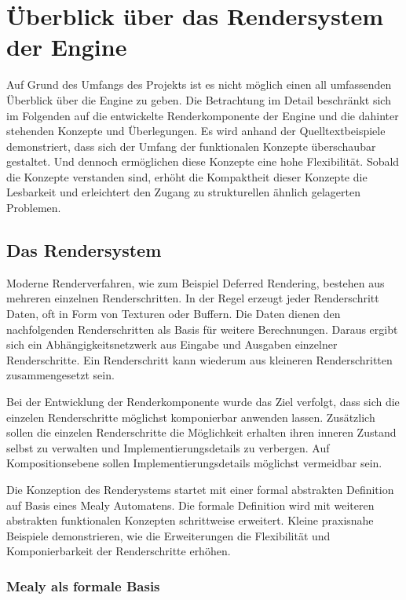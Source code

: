 \chapter{Überblick über das Rendersystem der Engine}
\label{chap:ueberblick-pipeline}

Auf Grund des Umfangs des Projekts ist es nicht möglich einen all umfassenden Überblick über die Engine zu geben. Die Betrachtung im Detail beschränkt sich im Folgenden auf die entwickelte Renderkomponente der Engine und die dahinter stehenden Konzepte und Überlegungen. Es wird anhand der Quelltextbeispiele demonstriert, dass sich der Umfang der funktionalen Konzepte überschaubar gestaltet. Und dennoch ermöglichen diese Konzepte eine hohe Flexibilität. Sobald die Konzepte verstanden sind, erhöht die Kompaktheit dieser Konzepte die Lesbarkeit und erleichtert den Zugang zu strukturellen ähnlich gelagerten Problemen.

\section{Das Rendersystem}

Moderne Renderverfahren, wie zum Beispiel Deferred Rendering, bestehen aus mehreren einzelnen Renderschritten. In der Regel erzeugt jeder Renderschritt Daten, oft in Form von Texturen oder Buffern. Die Daten dienen den nachfolgenden Renderschritten als Basis für weitere Berechnungen. Daraus ergibt sich ein Abhängigkeitsnetzwerk aus Eingabe und Ausgaben einzelner Renderschritte. Ein Renderschritt kann wiederum aus kleineren Renderschritten zusammengesetzt sein.

Bei der Entwicklung der Renderkomponente wurde das Ziel verfolgt, dass sich die einzelen Renderschritte möglichst komponierbar anwenden lassen. Zusätzlich sollen die einzelen Renderschritte die Möglichkeit erhalten ihren inneren Zustand selbst zu verwalten und Implementierungsdetails zu verbergen. Auf Kompositionsebene sollen Implementierungsdetails möglichst vermeidbar sein.

Die Konzeption des Renderystems startet mit einer formal abstrakten Definition auf Basis eines Mealy Automatens. Die formale Definition wird mit weiteren abstrakten funktionalen Konzepten schrittweise erweitert. Kleine praxisnahe Beispiele demonstrieren, wie die Erweiterungen die Flexibilität und Komponierbarkeit der Renderschritte erhöhen.

\subsection{Mealy als formale Basis}


